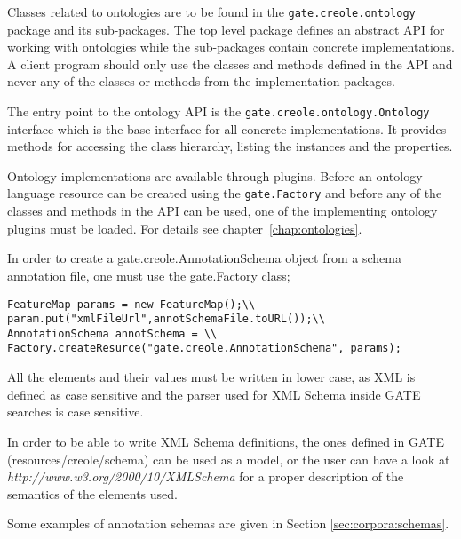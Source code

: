 Classes related to ontologies are to be found in the {\tt gate.creole.ontology}
package and its sub-packages. The top level package defines an abstract API for
working with ontologies while the sub-packages contain concrete implementations.
A client program should only use the classes and methods defined in the 
API and never any of the classes or methods from the implementation packages.

The entry point to the ontology API is the {\tt gate.creole.ontology.Ontology}
interface which is the base interface for all concrete implementations. It
provides methods for accessing the class hierarchy, listing the instances and the
properties.

Ontology implementations are available through plugins. Before an ontology
language resource can be created using the \texttt{gate.Factory} and before
any of the classes and methods in the API can be used, one of the implementing
ontology plugins must be loaded. For details see chapter~\ref{chap:ontologies}.


In order to create a gate.creole.AnnotationSchema object from a
schema annotation file, one must use the gate.Factory class;

\begin{lstlisting}
FeatureMap params = new FeatureMap();\\
param.put("xmlFileUrl",annotSchemaFile.toURL());\\
AnnotationSchema annotSchema = \\
Factory.createResurce("gate.creole.AnnotationSchema", params);
\end{lstlisting}

 All the elements and their values must be written
in lower case, as XML is defined as case sensitive and the parser used
for XML Schema inside GATE searches is case sensitive.

In order to be able to write XML Schema definitions, the ones defined in
GATE (resources/creole/schema) can be used as a model, or the user can
have a look at {\em http://www.w3.org/2000/10/XMLSchema} for a
proper description of the semantics of the elements used.

Some examples of annotation schemas are given in Section \ref{sec:corpora:schemas}.

